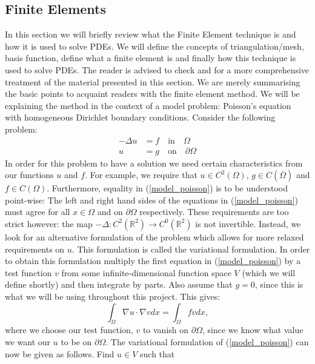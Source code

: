 \documentclass[12pt,a4paper]{article}
\theoremstyle{definition}
\begin{document}
\subsection{Finite Elements}
In this section we will briefly review what the Finite Element technique is and how it is used to solve PDEs.  We will define the concepts of triangulation/mesh, basis function, define what a finite element is and finally how this technique is used to solve PDEs.  The reader is advised to check \cite{logg2012automated} and \cite{brenner2007mathematical} for a more comprehensive treatment of the material presented in this section.  We are merely summarising the basic points to acquaint readers with the finite element method.   We will be explaining the method in the context of a model problem: Poisson's equation with homogeneous Dirichlet boundary conditions.  Consider the following problem:
\begin{equation}\label{model_poisson}
\begin{aligned}
-\Delta u &= f \quad \text{in}\quad \Omega\\
u &= g \quad \text{on}\quad \partial \Omega
\end{aligned}
\end{equation}
In order for this problem to have a solution we need certain characteristics from our functions $u$ and $f$.  For example, we require that $u\in C^2\left(\Omega\right) ,\,g\in C\left(\overline{\Omega}\right)$ and $f \in C\left(\Omega\right)$.  Furthermore, equality in (\ref{model_poisson}) is to be understood point-wise:  The left and right hand sides of the equations in (\ref{model_poisson}) must agree for all $x \in \Omega$ and on $\partial\Omega$ respectively. These requirements are too strict however:  the map $-\Delta : C^2\left(\mathbb{R}^2\right)\rightarrow C^0\left(\mathbb{R}^2\right)$ is not invertible.  Instead, we look for an alternative formulation of the problem which allows for more relaxed requirements on $u$.  This formulation is called the variational formulation.   In order to obtain this formulation multiply the first equation in (\ref{model_poisson}) by a test function $v$ from some infinite-dimensional function space $V$ (which we will define shortly) and then integrate by parts.  Also assume that $g=0$, since this is what we will be using throughout this project.  This gives:
\begin{equation}
\int_{\Omega}\nabla u \cdot \nabla v dx =\int_{\Omega}fvdx,
\end{equation}
where we choose our test function, $v$ to vanish on $\partial \Omega$, since we know what value we want our $u$ to be on $\partial \Omega$.  The variational formulation of (\ref{model_poisson}) can now be given as follows.  Find $u\in V$ such that
\end{document}
